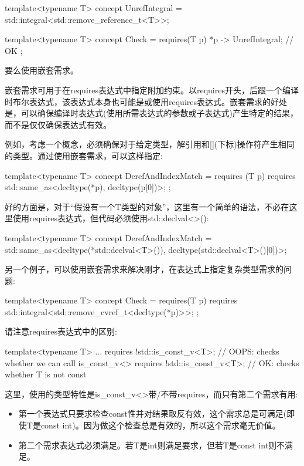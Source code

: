 \begin{cpp}
template<typename T>
concept UnrefIntegral = std::integral<std::remove_reference_t<T>>;

template<typename T>
concept Check = requires(T p) {
	{ *p } -> UnrefIntegral; // OK
};
\end{cpp}

要么使用嵌套需求。


嵌套需求可用于在requires表达式中指定附加约束。以requires开头，后跟一个编译时布尔表达式，该表达式本身也可能是或使用requires表达式。嵌套需求的好处是，可以确保编译时表达式(使用所需表达式的参数或子表达式)产生特定的结果，而不是仅仅确保表达式有效。

例如，考虑一个概念，必须确保对于给定类型，解引用和[](下标)操作符产生相同的类型。通过使用嵌套需求，可以这样指定:

\begin{cpp}
template<typename T>
concept DerefAndIndexMatch = requires (T p) {
								requires std::same_as<decltype(*p),
										decltype(p[0])>;
							};
\end{cpp}

好的方面是，对于“假设有一个T类型的对象”，这里有一个简单的语法，不必在这里使用requires表达式，但代码必须使用std::declval<>():

\begin{cpp}
template<typename T>
concept DerefAndIndexMatch = std::same_as<decltype(*std::declval<T>()),
			 decltype(std::declval<T>()[0])>;
\end{cpp}

另一个例子，可以使用嵌套需求来解决刚才，在表达式上指定复杂类型需求的问题:

\begin{cpp}
template<typename T>
concept Check = requires(T p) {
	requires std::integral<std::remove_cvref_t<decltype(*p)>>;
};
\end{cpp}

请注意requires表达式中的区别:

\begin{cpp}
template<typename T>
... requires {
	!std::is_const_v<T>; // OOPS: checks whether we can call is_const_v<>
	requires !std::is_const_v<T>; // OK: checks whether T is not const
}
\end{cpp}

这里，使用的类型特性是is\_const\_v<>带/不带requires，而只有第二个需求有用:

\begin{itemize}
\item
第一个表达式只要求检查const性并对结果取反有效，这个需求总是可满足(即使T是const int)。因为做这个检查总是有效的，所以这个需求毫无价值。

\item
第二个需求表达式必须满足。若T是int则满足要求，但若T是const int则不满足。
\end{itemize}


